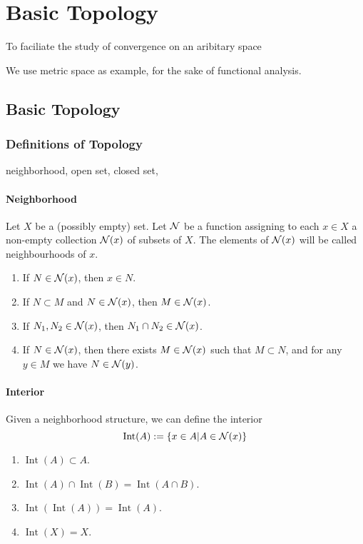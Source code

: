 \chapter{Basic Topology}




To faciliate the study of convergence on an aribitary space

We use metric space as example, for the sake of functional analysis.

\section{Basic Topology}

\subsection{Definitions of Topology}
neighborhood, open set, closed set, 

\subsubsection{Neighborhood}
Let $X$ be a (possibly empty) set. 
Let $\mathcal{N}$ be a function assigning to each $x\in X$ a non-empty collection $\mathcal{N}(x)$ of subsets of $X$.
The elements of $\mathcal{N}(x)$ will be called neighbourhoods of $x$.

\begin{enumerate}[label=(\roman*)]
    \item If $N\in \mathcal{N}(x)$, then $x\in N$.
    \item If $N\subset M$ and $N\in \mathcal{N}(x)$, then $M\in \mathcal{N}(x)$.
    \item If $N_1,N_2\in \mathcal{N}(x)$, then $N_1\cap N_2\in \mathcal{N}(x)$.
    \item If $N\in \mathcal{N}(x)$, then there exists $M\in\mathcal{N}(x)$ such that $M\subset N$, and for any $y\in M$ we have $N\in\mathcal{N}(y)$.
\end{enumerate}

\subsubsection{Interior}
Given a neighborhood structure, we can define the interior
$$\operatorname{Int}(A):=\{x\in A|A\in\mathcal{N}(x)\}$$


\begin{enumerate}[label=(\roman*)]
    \item $\operatorname{Int}(A)\subset A$.
    \item $\operatorname{Int}(A)\cap \operatorname{Int}(B)=\operatorname{Int}(A\cap B)$.
    \item $\operatorname{Int}(\operatorname{Int}(A))=\operatorname{Int}(A)$.
    \item $\operatorname{Int}(X)=X$.
\end{enumerate}

